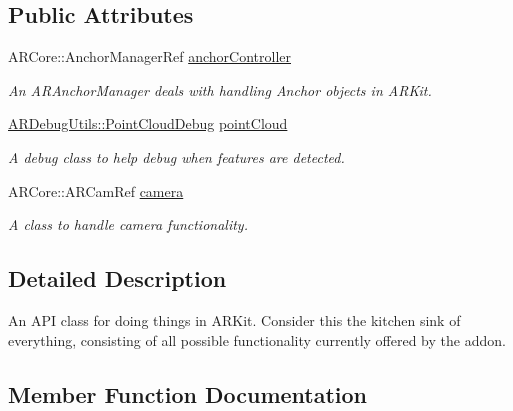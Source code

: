 \subsection*{Public Attributes}
\begin{DoxyCompactItemize}
\item 
\mbox{\label{class_a_r_processor_a8a1a8f16b30d2b0b4839a30d7ba4763d}} 
A\+R\+Core\+::\+Anchor\+Manager\+Ref \hyperlink{class_a_r_processor_a8a1a8f16b30d2b0b4839a30d7ba4763d}{anchor\+Controller}
\begin{DoxyCompactList}\small\item\em An A\+R\+Anchor\+Manager deals with handling Anchor objects in A\+R\+Kit. \end{DoxyCompactList}\item 
\mbox{\label{class_a_r_processor_a555e829fbf6b625537f6fd7cd9557002}} 
\hyperlink{class_a_r_debug_utils_1_1_point_cloud_debug}{A\+R\+Debug\+Utils\+::\+Point\+Cloud\+Debug} \hyperlink{class_a_r_processor_a555e829fbf6b625537f6fd7cd9557002}{point\+Cloud}
\begin{DoxyCompactList}\small\item\em A debug class to help debug when features are detected. \end{DoxyCompactList}\item 
\mbox{\label{class_a_r_processor_a0df4995c56cb187db281726d7631d9ed}} 
A\+R\+Core\+::\+A\+R\+Cam\+Ref \hyperlink{class_a_r_processor_a0df4995c56cb187db281726d7631d9ed}{camera}
\begin{DoxyCompactList}\small\item\em A class to handle camera functionality. \end{DoxyCompactList}\end{DoxyCompactItemize}


\subsection{Detailed Description}
An A\+PI class for doing things in A\+R\+Kit. Consider this the kitchen sink of everything, consisting of all possible functionality currently offered by the addon. 

\subsection{Member Function Documentation}
\mbox{\label{class_a_r_processor_a121cd3925743680196771ce07058d52e}} 
